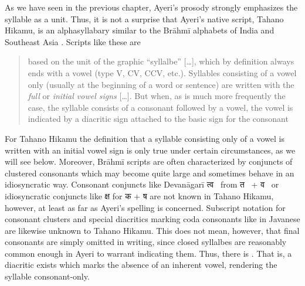 As we have seen in the previous chapter, Ayeri's prosody strongly emphasizes
the syllable as a unit. Thus, it is not a surprise that Ayeri's native script,
Tahano Hikamu, is an alphasyllabary similar to the Brāhmī
alphabets of India and Southeast Asia \parencites{salomon1996}{court1996}.
Scripts like these are

\blockcquote[376]{salomon1996}{based on the unit of the graphic 
\enquote{syllalbe} [\dots], which by definition always ends with a vowel (type V, 
CV, CCV, etc.). Syllables consisting of a vowel only (usually at the beginning 
of a word or sentence) are written with the \emph{full} or \emph{initial vowel 
signs} [\dots]. But when, as is much more frequently the case, the syllable 
consists of a consonant followed by a vowel, the vowel is indicated by a 
diacritic sign attached to the basic sign for the consonant}

For Tahano Hikamu the definition that a syllable consisting only of a vowel is
written with an initial vowel sign is only true under certain circumstances, as
we will see below. Moreover, Brāhmī scripts are often characterized by
conjuncts of clustered consonants which may become quite large and sometimes
behave in an idiosyncratic way. Consonant conjuncts like Devanāgarī {\FS
त्व}~ from {\FS त}~ + {\FS व}~ or idiosyncratic
conjuncts like {\FS क्ष}  for {\FS क}  + {\FS ष} 
are not known in Tahano Hikamu, however, at least as far as Ayeri's spelling is
concerned. Subscript notation for consonant clusters and special diacritics
marking coda consonants like in Javanese \citep[478--479]{kuipersmcdermott1996}
are likewise unknown to Tahano Hikamu. This does not mean, however, that final
consonants are simply omitted in writing, since closed syllalbes are reasonably
common enough in Ayeri to warrant indicating them. Thus, there is
. That is, a diacritic exists which marks the absence of an inherent
vowel, rendering the syllable consonant-only.

